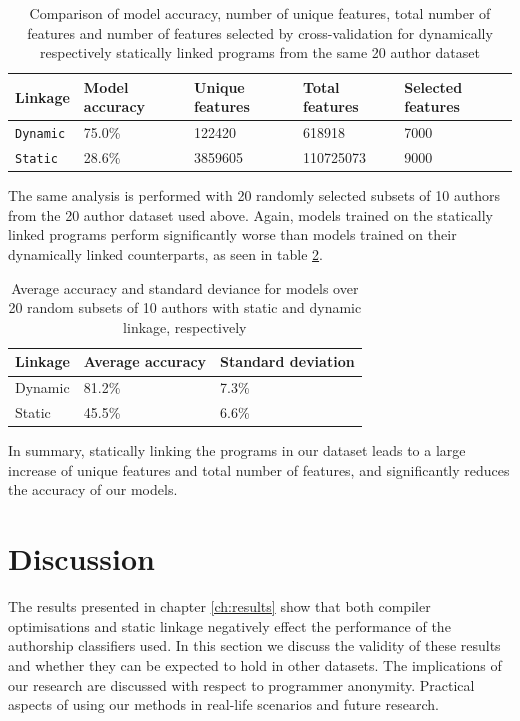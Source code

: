 \documentclass[a4paper,11pt]{kth-mag}
\begin{document}
\begin{table}[!htb]
    \centering
    \caption{Comparison of model accuracy, number of unique features, total
    number of features and number of features selected by cross-validation for
    dynamically respectively statically linked programs from the same 20 author
    dataset} 
        \begin{tabular}{ l l l l l }
        Linkage & Model accuracy & Unique features & Total features &
        Selected features \\ \hline
        \lstinline{Dynamic} & 75.0\% & 122420 & 618918 & 7000 \\
        \lstinline{Static} & 28.6\% & 3859605 & 110725073 & 9000 \\
        \end{tabular}
    \label{tab:20-static-results}
\end{table}

The same analysis is performed with 20 randomly selected subsets of 10 authors
from the 20 author dataset used above. Again, models trained on the statically
linked programs perform significantly worse than models trained on their
dynamically linked counterparts, as seen in table \ref{tab:10-static-results}. 

\begin{table}[!htb]
    \centering
    \caption{Average accuracy and standard deviance for models over 20 random
    subsets of 10 authors with static and dynamic linkage, respectively}
        \begin{tabular}{ l l l }
        Linkage & Average accuracy & Standard deviation \\
        \hline
        Dynamic & 81.2\% & 7.3\% \\
        Static & 45.5\% & 6.6\%
        \end{tabular}
   
    \label{tab:10-static-results}
\end{table}

In summary, statically linking the programs in our dataset leads to a
large increase of unique features and total number of features, and
significantly reduces the accuracy of our models.

\chapter{Discussion}
The results presented in chapter \ref{ch:results} show that both compiler
optimisations and static linkage negatively effect the performance of the
authorship classifiers used. In this section we discuss the validity of these  
results and whether they can be expected to hold in other datasets. The
implications of our research are discussed with respect to programmer
anonymity. Practical aspects of using our methods in real-life scenarios 
and future research.
\end{document}
